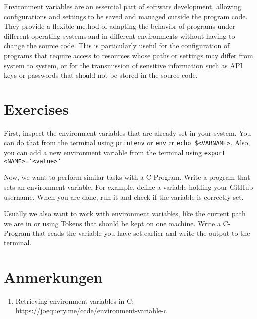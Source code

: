 \documentclass{dcbl/challenge}
\begin{document}
Environment variables are an essential part of software development, allowing configurations and settings to be saved and managed outside the program code. They provide a flexible method of adapting the behavior of programs under different operating systems and in different environments without having to change the source code. This is particularly useful for the configuration of programs that require access to resources whose paths or settings may differ from system to system, or for the transmission of sensitive information such as API keys or passwords that should not be stored in the source code.


\section*{Exercises}
\begin{aufgabe}
    First, inspect the environment variables that are already set in your system. You can do that from the terminal using \texttt{printenv} or \texttt{env} or \texttt{echo \$<VARNAME>}. Also, you can add a new environment variable from the terminal using \texttt{export <NAME>='<value>'}
\end{aufgabe}
\begin{aufgabe}
    Now, we want to perform similar tasks with a C-Program. Write a program that sets an environment variable. For example, define a variable holding your GitHub username. When you are done, run it and check if the variable is correctly set.
\end{aufgabe}

\begin{aufgabe}
    Usually we also want to work with environment variables, like the current path we are in or using Tokens that should be kept on one machine. Write a C-Program that reads the variable you have set earlier and write the output to the terminal.
\end{aufgabe}

\section*{Anmerkungen}
\begin{enumerate}
    \item Retrieving environment variables in C: \url{https://joequery.me/code/environment-variable-c}
\end{enumerate}
\end{document}
